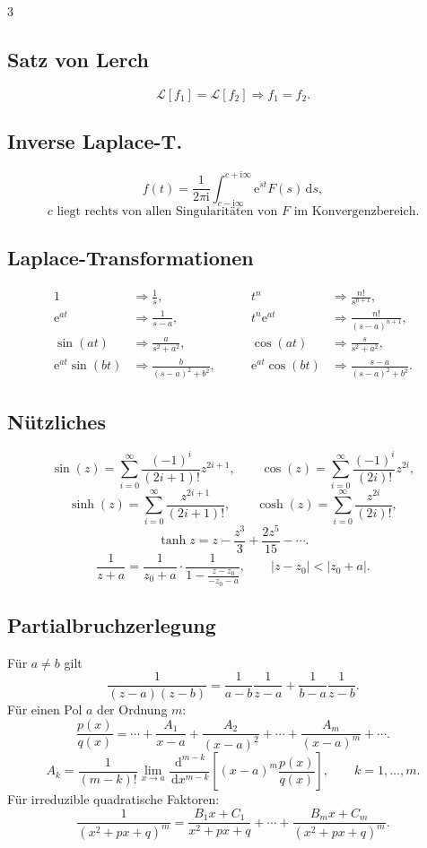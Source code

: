 \documentclass[a4paper,landscape]{article}
\newcommand{\dd}{\,\mathrm d}
\newcommand{\ee}{\mathrm e}
\newcommand{\ii}{\mathrm i}
\begin{document}
\begin{multicols*}{3}
\subsection*{Satz von Lerch}
\[
\mathcal L[f_1]=\mathcal L[f_2]\Rightarrow f_1=f_2.
\]

\subsection*{Inverse Laplace-T.}
\[
f(t)=\frac1{2\pi\ii}\int_{c-\ii\infty}^{c+\ii\infty}\ee^{st}F(s)\dd s,
\]
\[
c\text{ liegt rechts von allen Singularitäten von }F\text{ im Konvergenzbereich}.
\]

\subsection*{Laplace-Transformationen}
\[
\begin{alignedat}{2}
1&\Rightarrow\frac1s,\qquad
&t^n&\Rightarrow\frac{n!}{s^{n+1}},\\
\ee^{at}&\Rightarrow\frac1{s-a},\qquad
&t^n\ee^{at}&\Rightarrow\frac{n!}{(s-a)^{n+1}},\\[0.5mm]
\sin(at)&\Rightarrow\frac{a}{s^2+a^2},\qquad
&\cos(at)&\Rightarrow\frac{s}{s^2+a^2},\\
\ee^{at}\sin(bt)&\Rightarrow\frac{b}{(s-a)^2+b^2},\qquad
&\ee^{at}\cos(bt)&\Rightarrow\frac{s-a}{(s-a)^2+b^2}.
\end{alignedat}
\]

\subsection*{Nützliches}
\[
\sin(z)=\sum_{i=0}^{\infty}\frac{(-1)^i}{(2i+1)!}z^{2i+1},
\qquad \cos(z)=\sum_{i=0}^{\infty}\frac{(-1)^i}{(2i)!}z^{2i},
\]
\[
\sinh(z)=\sum_{i=0}^{\infty}\frac{z^{2i+1}}{(2i+1)!},
\qquad \cosh(z)=\sum_{i=0}^{\infty}\frac{z^{2i}}{(2i)!},
\]
\[
\tanh z=z-\frac{z^3}{3}+\frac{2z^5}{15}-\cdots.
\]
\[
\frac1{z+a}=\frac1{z_0+a}\cdot\frac1{1-\frac{z-z_0}{-z_0-a}},
\qquad |z-z_0|<|z_0+a|.
\]

\subsection*{Partialbruchzerlegung}
Für $a\ne b$ gilt
\[
\frac{1}{(z-a)(z-b)}=\frac{1}{a-b}\frac{1}{z-a}+\frac{1}{b-a}\frac{1}{z-b}.
\]
Für einen Pol $a$ der Ordnung $m$:
\[
\frac{p(x)}{q(x)}=\cdots+\frac{A_1}{x-a}+\frac{A_2}{(x-a)^2}+\cdots+\frac{A_m}{(x-a)^m}+\cdots .
\]
\[
A_k=\frac{1}{(m-k)!}\lim_{x\to a}\frac{\dd^{m-k}}{\dd x^{m-k}}
\left[(x-a)^m\frac{p(x)}{q(x)}\right],\qquad k=1,\ldots,m.
\]
Für irreduzible quadratische Faktoren:
\[
\frac{1}{(x^2+px+q)^m}=\frac{B_1x+C_1}{x^2+px+q}+\cdots+\frac{B_mx+C_m}{(x^2+px+q)^m}.
\]


\end{multicols*}
\end{document}
